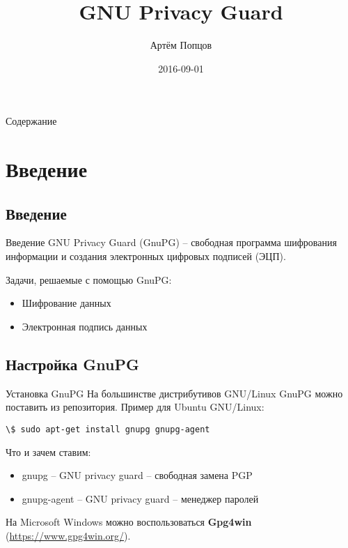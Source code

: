 \documentclass[presentation]{beamer}
\author{Артём Попцов}
\date{2016-09-01}
\title{GNU Privacy Guard}
\begin{document}
\maketitle



\begin{frame}{Содержание}
  \setcounter{tocdepth}{1}
  \tableofcontents
\end{frame}



\section{Введение}

\subsection{Введение}

\begin{frame}{Введение}
  \raisebox{-.30em}{\Large\HandRight}\hspace{.25em} GNU Privacy Guard
  (GnuPG) -- свободная программа шифрования информации и создания
  электронных цифровых подписей (ЭЦП).

  \vspace{5 mm}

  Задачи, решаемые с помощью GnuPG:
  \begin{itemize}
  \item Шифрование данных
  \item Электронная подпись данных
  \end{itemize}
\end{frame}



\subsection{Настройка GnuPG}

\begin{frame}[fragile]{Установка GnuPG}
  На большинстве дистрибутивов GNU/Linux GnuPG можно поставить из
  репозитория.  Пример для Ubuntu GNU/Linux:
\begin{Verbatim}[commandchars=\\\[\]]
\$ sudo apt-get install gnupg gnupg-agent
\end{Verbatim}
\vspace{5 mm}
Что и зачем ставим:
\begin{itemize}
\item \alert{gnupg} -- GNU privacy guard -- свободная замена PGP
\item \alert{gnupg-agent} -- GNU privacy guard -- менеджер паролей\newline
\end{itemize}

На Microsoft Windows можно воспользоваться \textbf{Gpg4win}
(\url{https://www.gpg4win.org/}).
\end{frame}
\end{document}
